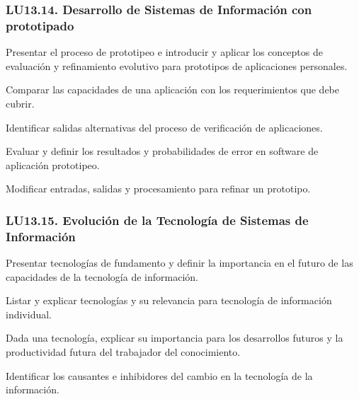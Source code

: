 \subsubsection{LU13.14. Desarrollo de Sistemas de Información con prototipado}\label{sec:BOK-LU13.14}\label{sec:LU13.14}
\begin{LearningUnit}
\begin{LUGoal}
\item Presentar el proceso de prototipeo e introducir y aplicar los conceptos de evaluación y refinamiento evolutivo para prototipos de aplicaciones personales.
\end{LUGoal}

\begin{LUObjective}
\item Comparar las capacidades de una aplicación con los requerimientos que debe cubrir.
\item Identificar salidas alternativas del proceso de verificación de aplicaciones.
\item Evaluar y definir los resultados y probabilidades de error en software de aplicación prototipeo.
\item Modificar entradas, salidas y procesamiento para refinar un prototipo.
\end{LUObjective}
\end{LearningUnit}

\subsubsection{LU13.15. Evolución de la Tecnología de Sistemas de Información}\label{sec:BOK-LU13.15}\label{sec:LU13.15}
\begin{LearningUnit}
\begin{LUGoal}
\item Presentar tecnologías de fundamento y definir la importancia en el futuro de las capacidades de la tecnología de información.
\end{LUGoal}

\begin{LUObjective}
\item Listar y explicar tecnologías y su relevancia para tecnología de información individual.
\item Dada una tecnología, explicar su importancia para los desarrollos futuros y la productividad futura del trabajador del conocimiento.
\item Identificar los causantes e inhibidores del cambio en la tecnología de la información.
\end{LUObjective}
\end{LearningUnit}

